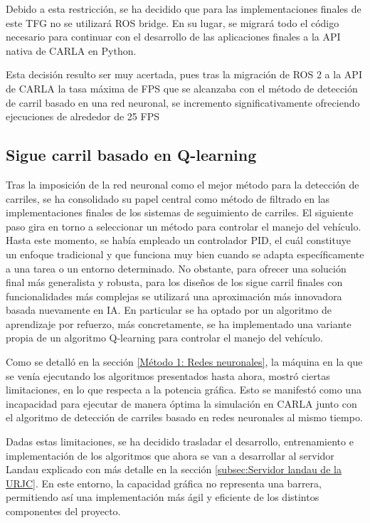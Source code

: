 \bigskip
Debido a esta restricción, se ha decidido que para las implementaciones finales de este \ac{TFG} no se utilizará ROS bridge. En su lugar, se migrará todo el código necesario para continuar con el desarrollo de las aplicaciones finales a la \ac{API} nativa de CARLA en Python.

\bigskip

Esta decisión resulto ser muy acertada, pues tras la migración de ROS 2 a la \ac{API} de CARLA la tasa máxima de \ac{FPS} que se alcanzaba con el método de detección de carril basado en una red neuronal, se incremento significativamente ofreciendo ejecuciones de alrededor de 25 \ac{FPS}

\subsection{Sigue carril basado en Q-learning}
\label{Sigue carril}

Tras la imposición de la red neuronal como el mejor método para la detección de carriles, se ha consolidado su papel central como método de filtrado en las implementaciones finales de los sistemas de seguimiento de carriles. El siguiente paso gira en torno a seleccionar un método para controlar el manejo del vehículo. Hasta este momento, se había empleado un controlador \ac{PID}, el cuál constituye un enfoque tradicional y que funciona muy bien cuando se adapta específicamente a una tarea o un entorno determinado. No obstante, para ofrecer una solución final más generalista y robusta, para los diseños de los sigue carril finales con funcionalidades más complejas se utilizará una aproximación más innovadora basada nuevamente en \ac{IA}. En particular se ha optado por un algoritmo de aprendizaje por refuerzo, más concretamente, se ha implementado una variante propia de un algoritmo Q-learning para controlar el manejo del vehículo.

\bigskip


Como se detalló en la sección \ref{Método 1: Redes neuronales}, la máquina en la que se venía ejecutando los algoritmos presentados hasta ahora, mostró ciertas limitaciones, en lo que respecta a la potencia gráfica. Esto se manifestó como una incapacidad para ejecutar de manera óptima la simulación en CARLA junto con el algoritmo de detección de carriles basado en redes neuronales al mismo tiempo.

\bigskip

Dadas estas limitaciones, se ha decidido trasladar el desarrollo, entrenamiento e implementación de los algoritmos que ahora se van a desarrollar al servidor Landau explicado con más detalle en la  sección \ref{subsec:Servidor landau de la URJC}. En este entorno, la capacidad gráfica no representa una barrera, permitiendo así una implementación más ágil y eficiente de los distintos componentes del proyecto.

